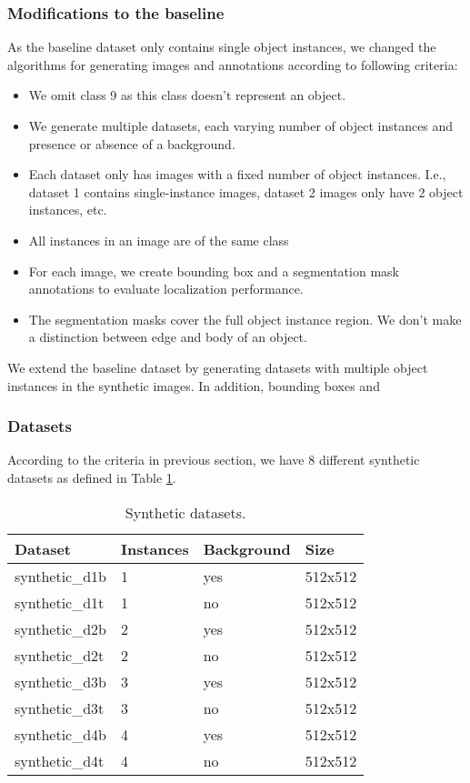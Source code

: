 \subsubsection{Modifications to the baseline}
As the baseline dataset only contains single object instances, we changed the algorithms for generating images and annotations according to following criteria:
\begin{itemize}
    \item We omit class 9 as this class doesn't represent an object.
    \item We generate multiple datasets, each varying number of object instances and presence or absence of a background.
    \item Each dataset only has images with a fixed number of object instances. I.e., dataset 1 contains single-instance images, dataset 2 images only have 2 object instances, etc.
    \item All instances in an image are of the same class
    \item For each image, we create bounding box and a segmentation mask annotations to evaluate localization performance.
    \item The segmentation masks cover the full object instance region. We don't make a distinction between edge and body of an object.
\end{itemize}
We extend the baseline dataset by generating datasets with multiple object instances in the synthetic images. In addition, bounding boxes and 

\subsubsection{Datasets}
According to the criteria in previous section, we have 8 different synthetic datasets as defined in Table \ref{tab:synthetic_datasets}.
\begin{table}[ht]
\centering
\begin{tabular}{|l|l|l|l|}
  \hline
  Dataset & Instances & Background & Size\\
  \hline
  synthetic\_d1b & 1 & yes & 512x512\\
  synthetic\_d1t & 1 & no & 512x512\\
  synthetic\_d2b & 2 & yes & 512x512\\
  synthetic\_d2t & 2 & no & 512x512\\
  synthetic\_d3b & 3 & yes & 512x512\\
  synthetic\_d3t & 3 & no & 512x512\\
  synthetic\_d4b & 4 & yes & 512x512\\
  synthetic\_d4t & 4 & no & 512x512\\
  \hline
\end{tabular}
\caption[Synthetic datasets]{Synthetic datasets.}
\label{tab:synthetic_datasets}
\end{table}

